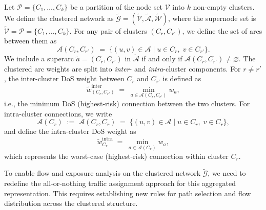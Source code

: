 \documentclass[lettersize,journal]{IEEEtran}
\begin{document}
Let $\mathcal{P} = \{C_1,\dots,C_k\}$ be a partition of the node set $\mathcal{V}$ into $k$ non-empty clusters.
We define the clustered network as $\tilde{\mathcal{G}} = (\tilde{\mathcal{V}}, \tilde{\mathcal{A}}, \tilde{\mathcal{W}})$,
where the supernode set is $\tilde{\mathcal{V}} = \mathcal{P} = \{C_1,\dots,C_k\}$.
For any pair of clusters $(C_r, C_{r'})$, we define the set of arcs between them as
\[
  \mathcal{A}(C_r, C_{r'})
  \;=\;
  \bigl\{ (u,v) \in \mathcal{A} \;\big|\; u \in C_r,\; v \in C_{r'} \bigr\}.
\]
We include a superarc $\tilde{a} = (C_r, C_{r'})$ in $\tilde{\mathcal{A}}$ if and only if
$\mathcal{A}(C_r, C_{r'}) \neq \varnothing$. The clustered arc weights are split into \emph{inter}- and \emph{intra}-cluster components.
For $r \neq r'$, the inter-cluster DoS weight between $C_r$ and $C_{r'}$ is defined as
\begin{equation}
  \tilde{w}^{\mathrm{inter}}_{(C_r, C_{r'})}
  \;=\;
  \min_{a \in \mathcal{A}(C_r, C_{r'})} w_a,
\end{equation}
i.e., the minimum DoS (highest-risk) connection between the two clusters. For intra-cluster connections, we write
\[
  \mathcal{A}(C_r)
  \;:=\;
  \mathcal{A}(C_r, C_r)
  \;=\;
  \bigl\{ (u,v) \in \mathcal{A} \;\big|\; u \in C_r,\; v \in C_r \bigr\},
\]
and define the intra-cluster DoS weight as
\begin{equation}
  \tilde{w}^{\mathrm{intra}}_{C_r}
  \;=\;
  \min_{a \in \mathcal{A}(C_r)} w_a,
\end{equation}
which represents the worst-case (highest-risk) connection within cluster $C_r$.


To enable flow and exposure analysis on the clustered network $\tilde{\mathcal{G}}$, we need to redefine the all-or-nothing traffic assignment approach for this aggregated representation. This requires establishing new rules for path selection and flow distribution across the clustered structure.


\end{document}
